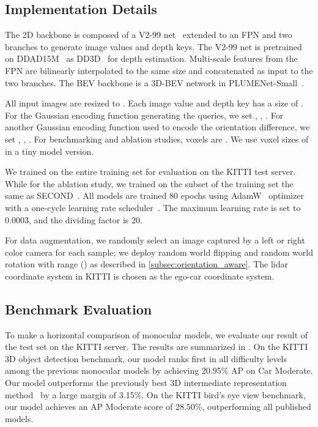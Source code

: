 \documentclass[10pt,twocolumn,letterpaper]{article}
\begin{document}
\subsection{Implementation Details}
The 2D backbone is composed of a V2-99 net~\cite{Lee2020CenterMaskRA} extended to an FPN and two branches to generate image values and depth keys. The V2-99 net is pretrained on DDAD15M~\cite{Guizilini20203DPF} as DD3D~\cite{Park2021IsPN} for depth estimation.  Multi-scale features from the FPN are bilinearly interpolated to the same size  and concatenated as input to the two branches. The BEV backbone is a 3D-BEV network in PLUMENet-Small~\cite{Wang2021PLUMENetE3}.

All input images are resized to . Each image value and depth key has a size of . For the Gaussian encoding function generating the queries, we set , , . For another Gaussian encoding function used to encode the orientation difference, we set , , . For benchmarking and ablation studies, voxels are . We use voxel sizes of  in a tiny model version.

We trained on the entire training set for evaluation on the KITTI test server. While for the ablation study, we trained on the subset of the training set the same as SECOND~\cite{yan2018second}. All models are trained 80 epochs using AdamW~\cite{Loshchilov2019DecoupledWD} optimizer with a one-cycle learning rate scheduler~\cite{Smith2019SuperconvergenceVF}. The maximum learning rate is set to 0.0003, and the dividing factor is 20.

For data augmentation, we randomly select an image captured by a left or right color camera for each sample; we deploy random world flipping and random world rotation with range () as described in \cref{subsec:orientation_aware}. The lidar coordinate system in KITTI is chosen as the ego-car coordinate system.

\subsection{Benchmark Evaluation}
\noindent \fontsize{10pt}{\baselineskip}\selectfont {\bf Comparison with State-of-the-Art Methods.}
To make a horizontal comparison of monocular models, we evaluate our result of the test set on the KITTI server. The results are summarized in . On the KITTI 3D object detection benchmark, our model ranks first in all difficulty levels among the previous monocular models by achieving 20.95\% AP on Car Moderate. Our model outperforms the previously best 3D intermediate representation method~\cite{Hu2022DeepLM} by a large margin of 3.15\%. On the KITTI bird's eye view benchmark, our model achieves an AP Moderate score of 28.50\%, outperforming all published models.
\setlength{\parskip}{5pt}
\end{document}
